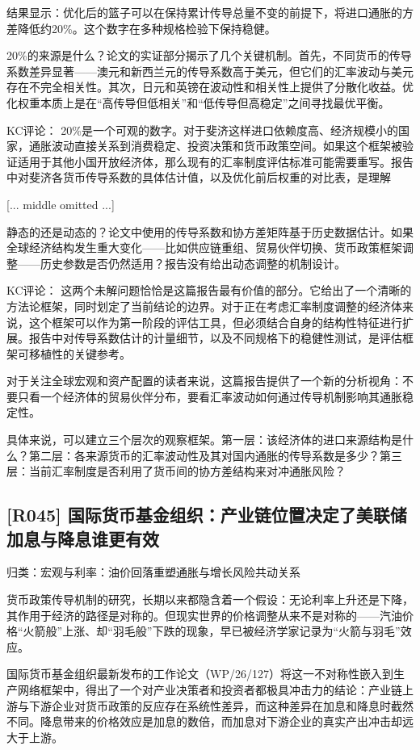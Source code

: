 \documentclass[11pt]{ctexart}
\begin{document}
结果显示：优化后的篮子可以在保持累计传导总量不变的前提下，将进口通胀的方差降低约20\%。这个数字在多种规格检验下保持稳健。

20\%的来源是什么？论文的实证部分揭示了几个关键机制。首先，不同货币的传导系数差异显著——澳元和新西兰元的传导系数高于美元，但它们的汇率波动与美元存在不完全相关性。其次，日元和英镑在波动性和相关性上提供了分散化收益。优化权重本质上是在“高传导但低相关”和“低传导但高稳定”之间寻找最优平衡。

KC评论： 20\%是一个可观的数字。对于斐济这样进口依赖度高、经济规模小的国家，通胀波动直接关系到消费稳定、投资决策和货币政策空间。如果这个框架被验证适用于其他小国开放经济体，那么现有的汇率制度评估标准可能需要重写。报告中对斐济各货币传导系数的具体估计值，以及优化前后权重的对比表，是理解

[... middle omitted ...]

静态的还是动态的？论文中使用的传导系数和协方差矩阵基于历史数据估计。如果全球经济结构发生重大变化——比如供应链重组、贸易伙伴切换、货币政策框架调整——历史参数是否仍然适用？报告没有给出动态调整的机制设计。

KC评论： 这两个未解问题恰恰是这篇报告最有价值的部分。它给出了一个清晰的方法论框架，同时划定了当前结论的边界。对于正在考虑汇率制度调整的经济体来说，这个框架可以作为第一阶段的评估工具，但必须结合自身的结构性特征进行扩展。报告中对传导系数估计的计量细节，以及不同规格下的稳健性测试，是评估框架可移植性的关键参考。

对于关注全球宏观和资产配置的读者来说，这篇报告提供了一个新的分析视角：不要只看一个经济体的贸易伙伴分布，要看汇率波动如何通过传导机制影响其通胀稳定性。

具体来说，可以建立三个层次的观察框架。第一层：该经济体的进口来源结构是什么？第二层：各来源货币的汇率波动性及其对国内通胀的传导系数是多少？第三层：当前汇率制度是否利用了货币间的协方差结构来对冲通胀风险？

\subsection{[R045] 国际货币基金组织：产业链位置决定了美联储加息与降息谁更有效}
{\small\color{refgray}归类：宏观与利率：油价回落重塑通胀与增长风险共动关系}

货币政策传导机制的研究，长期以来都隐含着一个假设：无论利率上升还是下降，其作用于经济的路径是对称的。但现实世界的价格调整从来不是对称的——汽油价格“火箭般”上涨、却“羽毛般”下跌的现象，早已被经济学家记录为“火箭与羽毛”效应。

国际货币基金组织最新发布的工作论文（WP/26/127）将这一不对称性嵌入到生产网络框架中，得出了一个对产业决策者和投资者都极具冲击力的结论：产业链上游与下游企业对货币政策的反应存在系统性差异，而这种差异在加息和降息时截然不同。降息带来的价格效应是加息的数倍，而加息对下游企业的真实产出冲击却远大于上游。
\end{document}
